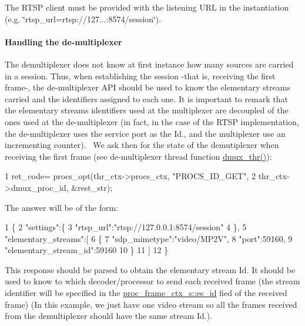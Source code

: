 The R\+T\+SP client must be provided with the listening U\+RL in the instantiation (e.\+g. \char`\"{}rtsp\+\_\+url=rtsp\+://127...\+:8574/session\char`\"{}).

\paragraph*{Handling the de-\/multiplexer}

The demultiplexer does not know at first instance how many sources are carried in a session. Thus, when establishing the session -\/that is, receiving the first frame-\/, the de-\/multiplexer A\+PI should be used to know the elementary streams carried and the identifiers assigned to each one. It is important to remark that the elementary streams identifiers used at the multiplexer are decoupled of the ones used at the de-\/multiplexer (in fact, in the case of the R\+T\+SP implementation, the de-\/multiplexer uses the service port as the Id., and the multiplexer use an incrementing counter).~\newline
 We ask then for the state of the demutiplexer when receiving the first frame (see de-\/multiplexer thread function \textquotesingle{}\hyperlink{codecs__muxers__loopback_8c_ae66adca53cb5b2afde52cb2381a2384a}{dmux\+\_\+thr()}\textquotesingle{})\+: 
\begin{DoxyCode}
1 ret\_code= procs\_opt(thr\_ctx->procs\_ctx, "PROCS\_ID\_GET",
2         thr\_ctx->dmux\_proc\_id, &rest\_str);
\end{DoxyCode}
 The answer will be of the form\+: 
\begin{DoxyCode}
1 \{
2    "settings":\{
3       "rtsp\_url":"rtsp://127.0.0.1:8574/session"
4    \},
5    "elementary\_streams":[
6       \{
7          "sdp\_mimetype":"video/MP2V",
8          "port":59160,
9          "elementary\_stream\_id":59160
10       \}
11    ]
12 \}
\end{DoxyCode}
 This response should be parsed to obtain the elementary stream Id. It should be used to know to which decoder/processor to send each received frame (the stream identifier will be specified in the \hyperlink{structproc__frame__ctx__s_a457dcb8ae6440506054f07483f48be1f}{proc\+\_\+frame\+\_\+ctx\+\_\+s\+::es\+\_\+id} fied of the received frame) (In this example, we just have one video stream so all the frames received from the demultiplexer should have the same stream Id.). 
